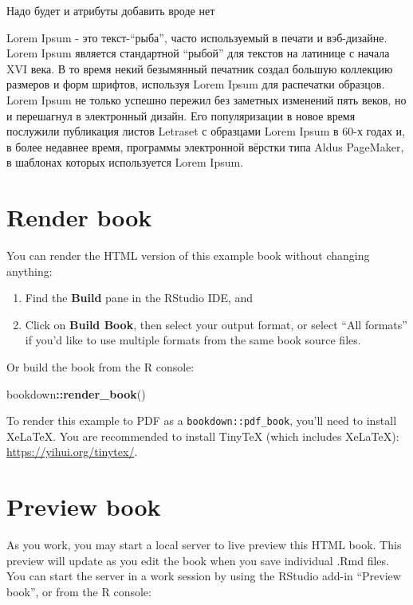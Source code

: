 \documentclass[
  12pt,
  a4paper,
]{book}
\newenvironment{Shaded}{\begin{snugshade}}{\end{snugshade}}
\newcommand{\FunctionTok}[1]{\textcolor[rgb]{0.13,0.29,0.53}{\textbf{#1}}}
\newcommand{\NormalTok}[1]{#1}
\newcommand{\SpecialCharTok}[1]{\textcolor[rgb]{0.81,0.36,0.00}{\textbf{#1}}}
\theoremstyle{definition}
\theoremstyle{definition}
\theoremstyle{definition}
\theoremstyle{definition}
\theoremstyle{remark}
\begin{document}
Надо будет и атрибуты добавить вроде нет

Lorem Ipsum - это текст-``рыба'', часто используемый в печати и вэб-дизайне. Lorem Ipsum является стандартной ``рыбой'' для текстов на латинице с начала XVI века. В то время некий безымянный печатник создал большую коллекцию размеров и форм шрифтов, используя Lorem Ipsum для распечатки образцов. Lorem Ipsum не только успешно пережил без заметных изменений пять веков, но и перешагнул в электронный дизайн. Его популяризации в новое время послужили публикация листов Letraset с образцами Lorem Ipsum в 60-х годах и, в более недавнее время, программы электронной вёрстки типа Aldus PageMaker, в шаблонах которых используется Lorem Ipsum.

\section{Render book}\label{render-book}

You can render the HTML version of this example book without changing anything:

\begin{enumerate}
\def\labelenumi{\arabic{enumi}.}
\item
  Find the \textbf{Build} pane in the RStudio IDE, and
\item
  Click on \textbf{Build Book}, then select your output format, or select ``All formats'' if you'd like to use multiple formats from the same book source files.
\end{enumerate}

Or build the book from the R console:

\begin{Shaded}
\begin{Highlighting}[]
\NormalTok{bookdown}\SpecialCharTok{::}\FunctionTok{render\_book}\NormalTok{()}
\end{Highlighting}
\end{Shaded}

To render this example to PDF as a \texttt{bookdown::pdf\_book}, you'll need to install XeLaTeX. You are recommended to install TinyTeX (which includes XeLaTeX): \url{https://yihui.org/tinytex/}.

\section{Preview book}\label{preview-book}

As you work, you may start a local server to live preview this HTML book. This preview will update as you edit the book when you save individual .Rmd files. You can start the server in a work session by using the RStudio add-in ``Preview book'', or from the R console:
\end{document}
